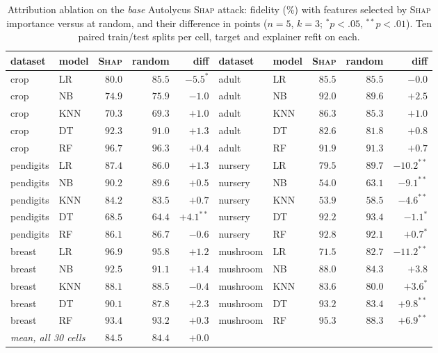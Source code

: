 \documentclass[sigconf,anonymous,review]{acmart}
\begin{document}
\begin{table}[t]
\centering
\caption{Attribution ablation on the \emph{base} Autolycus \textsc{Shap} attack: fidelity (\%) with features selected by
\textsc{Shap} importance versus at random, and their difference in points ($n{=}5$, $k{=}3$;
$^{*}p{<}.05$, $^{**}p{<}.01$). Ten paired train/test splits per cell, target and explainer refit on
each.}
\label{tab:shap-attr}
\begin{tabular}{llrrr@{\hskip 2em}llrrr}
\toprule
dataset & model & \textsc{Shap} & random & diff & dataset & model & \textsc{Shap} & random & diff \\
\midrule
crop & LR & $80.0$ & $85.5$ & $-5.5^{*}$  & adult & LR & $85.5$ & $85.5$ & $-0.0$ \\
crop & NB & $74.9$ & $75.9$ & $-1.0$  & adult & NB & $92.0$ & $89.6$ & $+2.5$ \\
crop & KNN & $70.3$ & $69.3$ & $+1.0$  & adult & KNN & $86.3$ & $85.3$ & $+1.0$ \\
crop & DT & $92.3$ & $91.0$ & $+1.3$  & adult & DT & $82.6$ & $81.8$ & $+0.8$ \\
crop & RF & $96.7$ & $96.3$ & $+0.4$  & adult & RF & $91.9$ & $91.3$ & $+0.7$ \\
pendigits & LR & $87.4$ & $86.0$ & $+1.3$  & nursery & LR & $79.5$ & $89.7$ & $-10.2^{**}$ \\
pendigits & NB & $90.2$ & $89.6$ & $+0.5$  & nursery & NB & $54.0$ & $63.1$ & $-9.1^{**}$ \\
pendigits & KNN & $84.2$ & $83.5$ & $+0.7$  & nursery & KNN & $53.9$ & $58.5$ & $-4.6^{**}$ \\
pendigits & DT & $68.5$ & $64.4$ & $+4.1^{**}$  & nursery & DT & $92.2$ & $93.4$ & $-1.1^{*}$ \\
pendigits & RF & $86.1$ & $86.7$ & $-0.6$  & nursery & RF & $92.8$ & $92.1$ & $+0.7^{*}$ \\
breast & LR & $96.9$ & $95.8$ & $+1.2$  & mushroom & LR & $71.5$ & $82.7$ & $-11.2^{**}$ \\
breast & NB & $92.5$ & $91.1$ & $+1.4$  & mushroom & NB & $88.0$ & $84.3$ & $+3.8$ \\
breast & KNN & $88.1$ & $88.5$ & $-0.4$  & mushroom & KNN & $83.6$ & $80.0$ & $+3.6^{*}$ \\
breast & DT & $90.1$ & $87.8$ & $+2.3$  & mushroom & DT & $93.2$ & $83.4$ & $+9.8^{**}$ \\
breast & RF & $93.4$ & $93.2$ & $+0.3$  & mushroom & RF & $95.3$ & $88.3$ & $+6.9^{**}$ \\
\midrule
\multicolumn{2}{l}{\emph{mean, all 30 cells}} & $84.5$ & $84.4$ & $+0.0$ & & & & & \\
\bottomrule
\end{tabular}
\end{table}
\end{document}
